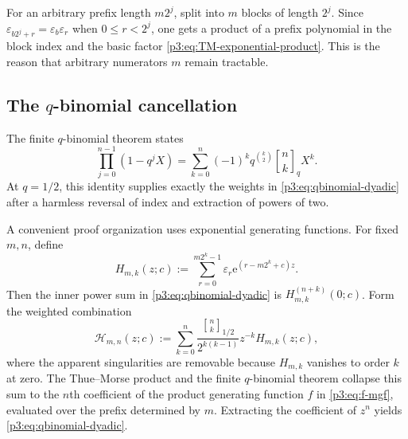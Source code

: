 \documentclass[11pt]{article}
\numberwithin{equation}{section}
\theoremstyle{definition}
\theoremstyle{remark}
\newcommand{\eps}{\varepsilon}
\newcommand{\e}{\mathrm e}
\newcommand{\GaussBinom}[3]{\genfrac{[}{]}{0pt}{}{#1}{#2}_{#3}}
\begin{document}
For an arbitrary prefix length $m2^j$, split into $m$ blocks of length $2^j$.  Since $\eps_{b2^j+r}=\eps_b\eps_r$ when $0\le r<2^j$, one gets a product of a prefix polynomial in the block index and the basic factor \eqref{p3:eq:TM-exponential-product}.  This is the reason that arbitrary numerators $m$ remain tractable.

\subsection{The $q$-binomial cancellation}

The finite $q$-binomial theorem states
\begin{equation}\label{p3:eq:finite-q-binomial}
 \prod_{j=0}^{n-1}(1-q^jX)
 =\sum_{k=0}^{n}(-1)^k q^{\binom k2}
   \GaussBinom{n}{k}{q}X^k.
\end{equation}
At $q=1/2$, this identity supplies exactly the weights in \eqref{p3:eq:qbinomial-dyadic} after a harmless reversal of index and extraction of powers of two.

A convenient proof organization uses exponential generating functions.  For fixed $m,n$, define
\begin{equation}\label{p3:eq:prefix-exp}
 H_{m,k}(z;c):=
 \sum_{r=0}^{m2^k-1}\eps_r\e^{(r-m2^k+c)z}.
\end{equation}
Then the inner power sum in \eqref{p3:eq:qbinomial-dyadic} is $H_{m,k}^{(n+k)}(0;c)$.  Form the weighted combination
\begin{equation}\label{p3:eq:weighted-H}
 \mathcal H_{m,n}(z;c):=
 \sum_{k=0}^{n}
 \frac{\GaussBinom{n}{k}{1/2}}{2^{k(k-1)}}
 z^{-k}H_{m,k}(z;c),
\end{equation}
where the apparent singularities are removable because $H_{m,k}$ vanishes to order $k$ at zero.  The Thue--Morse product and the finite $q$-binomial theorem collapse this sum to the $n$th coefficient of the product generating function $f$ in \eqref{p3:eq:f-mgf}, evaluated over the prefix determined by $m$.  Extracting the coefficient of $z^n$ yields \eqref{p3:eq:qbinomial-dyadic}.
\end{document}
